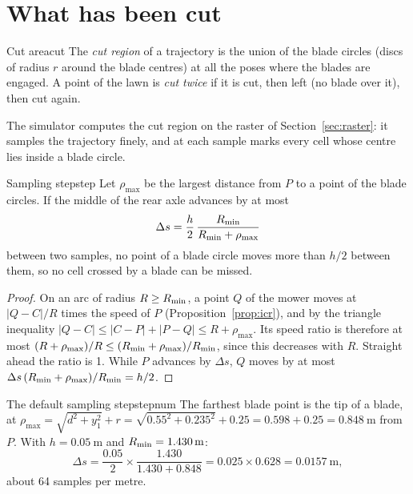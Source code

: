 \section{What has been cut}

\begin{definition}{Cut area}{cut}
  The \emph{cut region} of a trajectory is the union of the blade circles
  (discs of radius $r$ around the blade centres) at all the poses where the
  blades are engaged. A point of the lawn is \emph{cut twice} if it is cut,
  then left (no blade over it), then cut again.
\end{definition}

The simulator computes the cut region on the raster of
Section~\ref{sec:raster}: it samples the trajectory finely, and at each
sample marks every cell whose centre lies inside a blade circle.

\begin{proposition}{Sampling step}{step}
  Let $\rho_{\max}$ be the largest distance from $P$ to a point of the blade
  circles. If the middle of the rear axle advances by at most
  \[
    \Delta s = \frac h2 \,\frac{R_{\min}}{R_{\min} + \rho_{\max}}
  \]
  between two samples, no point of a blade circle moves more than $h/2$
  between them, so no cell crossed by a blade can be missed.
\end{proposition}

\begin{proof}
  On an arc of radius $R \ge R_{\min}$, a point $Q$ of the mower moves at
  $|Q - C| / R$ times the speed of $P$ (Proposition~\ref{prop:icr}), and by
  the triangle inequality $|Q - C| \le |C - P| + |P - Q| \le R +
  \rho_{\max}$. Its speed ratio is therefore at most $(R + \rho_{\max})/R
  \le (R_{\min} + \rho_{\max})/R_{\min}$, since this decreases with $R$. Straight
  ahead the ratio is 1. While $P$ advances by $\Delta s$, $Q$ moves by at
  most $\Delta s\,(R_{\min} + \rho_{\max})/R_{\min} = h/2$.
\end{proof}

\begin{example}{The default sampling step}{stepnum}
  The farthest blade point is the tip of a blade, at
  $\rho_{\max} = \sqrt{d^2 + y_1^2} + r = \sqrt{0.55^2 + 0.235^2} + 0.25 =
  0.598 + 0.25 = \SI{0.848}{\metre}$ from $P$. With $h = \SI{0.05}{\metre}$
  and $R_{\min} = \SI{1.430}{\metre}$:
  \[
    \Delta s = \frac{0.05}{2} \times \frac{1.430}{1.430 + 0.848}
    = 0.025 \times 0.628 = \SI{0.0157}{\metre},
  \]
  about 64 samples per metre.
\end{example}


